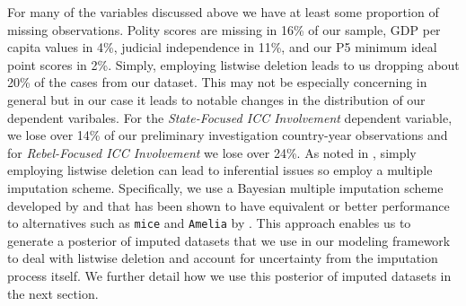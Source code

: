 For many of the variables discussed above we have at least some proportion of missing observations. Polity scores are missing in 16\% of our sample, GDP per capita values in 4\%, judicial independence in 11\%, and our P5 minimum ideal point scores in 2\%. Simply, employing listwise deletion leads to us dropping about 20\% of the cases from our dataset. This may not be especially concerning in general but in our case it leads to notable changes in the distribution of our dependent varibales. For the \emph{State-Focused ICC Involvement} dependent variable, we lose over 14\% of our preliminary investigation country-year observations and for \emph{Rebel-Focused ICC Involvement} we lose over 24\%. As noted in \citet{honaker:king:2010}, simply employing listwise deletion can lead to inferential issues so employ a multiple imputation scheme. Specifically, we use a Bayesian multiple imputation scheme developed by \citet{hoff:2007} and that has been shown to have equivalent or better performance to alternatives such as \texttt{mice} and \texttt{Amelia} by \citet{hollenbach:etal:2018}. This approach enables us to generate a posterior of imputed datasets that we use in our modeling framework to deal with listwise deletion and account for uncertainty from the imputation process itself. We further detail how we use this posterior of imputed datasets in the next section. 
